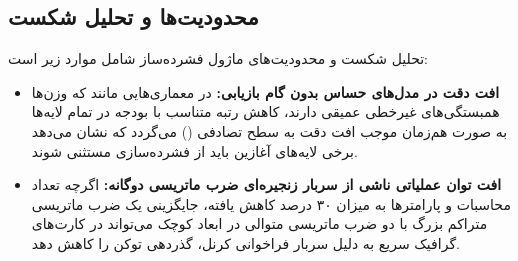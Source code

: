 \subsection{محدودیت‌ها و تحلیل شکست}
تحلیل شکست و محدودیت‌های ماژول فشرده‌ساز  شامل موارد زیر است:
\begin{itemize}
    \item \textbf{افت دقت در مدل‌های حساس بدون گام بازیابی:} در معماری‌هایی مانند  که وزن‌ها همبستگی‌های غیرخطی عمیقی دارند، کاهش رتبه متناسب با بودجه در تمام لایه‌ها به صورت هم‌زمان موجب افت دقت به سطح تصادفی () می‌گردد که نشان می‌دهد برخی لایه‌های آغازین باید از فشرده‌سازی مستثنی شوند.
    \item \textbf{افت توان عملیاتی ناشی از سربار زنجیره‌ای ضرب ماتریسی دوگانه:} اگرچه تعداد محاسبات و پارامترها به میزان ۳۰ درصد کاهش یافته، جایگزینی یک ضرب ماتریسی متراکم بزرگ با دو ضرب ماتریسی متوالی در ابعاد کوچک می‌تواند در کارت‌های گرافیک سریع به دلیل سربار فراخوانی کرنل، گذردهی توکن را کاهش دهد.
\end{itemize}
